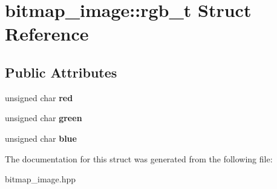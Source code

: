 \hypertarget{structbitmap__image_1_1rgb__t}{}\section{bitmap\+\_\+image\+:\+:rgb\+\_\+t Struct Reference}
\label{structbitmap__image_1_1rgb__t}
\subsection*{Public Attributes}
\begin{DoxyCompactItemize}
\item 
\mbox{\label{structbitmap__image_1_1rgb__t_a260d33767277153bbad6308a206a1d16}} 
unsigned char {\bfseries red}
\item 
\mbox{\label{structbitmap__image_1_1rgb__t_a0f3421a4b0fc9792087fab70c9fc0b71}} 
unsigned char {\bfseries green}
\item 
\mbox{\label{structbitmap__image_1_1rgb__t_a687dd0709eb2baa5f6ab5a77554369bc}} 
unsigned char {\bfseries blue}
\end{DoxyCompactItemize}


The documentation for this struct was generated from the following file\+:\begin{DoxyCompactItemize}
\item 
bitmap\+\_\+image.\+hpp\end{DoxyCompactItemize}
